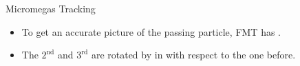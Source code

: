 \begin{frame}{Micromegas Tracking}
    \label{20.08::fmt_geometry}

    \vspace{6pt}

    \begin{itemize}
        \item
            To get an accurate picture of the passing particle, FMT has .

        \item
            The $2^\text{nd}$ and $3^\text{rd}$ are rotated by  in  with respect to the one before.
    \end{itemize}

    \vspace{6pt}

    \begin{center}
    \end{center}

\end{frame}
